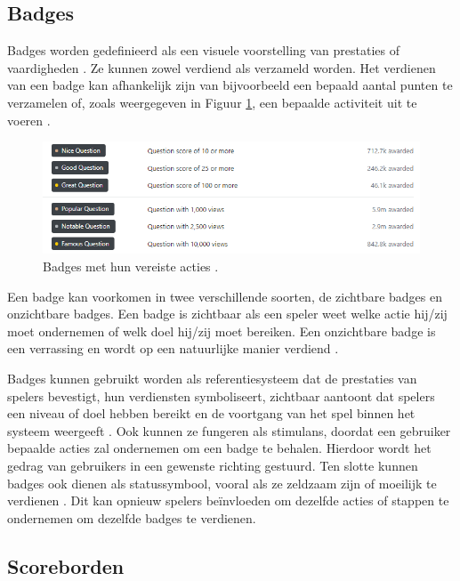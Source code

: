 \subsection{Badges}

Badges worden gedefinieerd als een visuele voorstelling van prestaties of vaardigheden \autocite{Costa2019}. Ze kunnen zowel verdiend als verzameld worden. Het verdienen van een badge kan afhankelijk zijn van bijvoorbeeld een bepaald aantal punten te verzamelen of, zoals weergegeven in Figuur \ref{fig:badges}, een bepaalde activiteit uit te voeren \autocite{Sailer2016}.

\begin{figure}
    \includegraphics[width=\linewidth]{Badges.png}
    \caption{Badges met hun vereiste acties \autocite{Badges2021}.}
    \label{fig:badges}
\end{figure}

Een badge kan voorkomen in twee verschillende soorten, de zichtbare badges en onzichtbare badges. Een badge is zichtbaar als een speler weet welke actie hij/zij moet ondernemen of welk doel hij/zij moet bereiken. Een onzichtbare badge is een verrassing en wordt op een natuurlijke manier verdiend \autocite{Costa2019}.

Badges kunnen gebruikt worden als referentiesysteem dat de prestaties van spelers bevestigt, hun verdiensten symboliseert, zichtbaar aantoont dat spelers een niveau of doel hebben bereikt \autocite{Anderson2013} en de voortgang van het spel binnen het systeem weergeeft \autocite{Zichermann2011}. Ook kunnen ze fungeren als stimulans, doordat een gebruiker bepaalde acties zal ondernemen om een badge te behalen. Hierdoor wordt het gedrag van gebruikers in een gewenste richting gestuurd. Ten slotte kunnen badges ook dienen als statussymbool, vooral als ze zeldzaam zijn of moeilijk te verdienen \autocite{Sailer2016}. Dit kan opnieuw spelers beïnvloeden om dezelfde acties of stappen te ondernemen om dezelfde badges te verdienen.

\subsection{Scoreborden}

